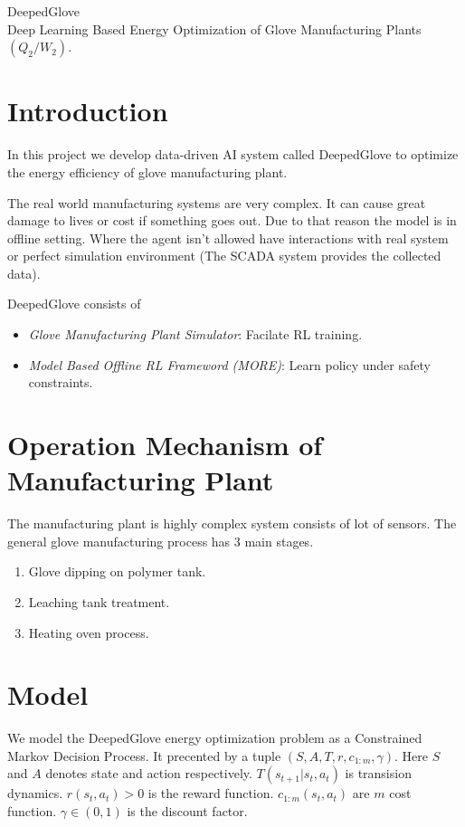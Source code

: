 \documentclass{article}
\begin{document}
\begin{center}
    \huge{DeepedGlove}\\[0.4em]
    \Large{Deep Learning Based Energy Optimization of Glove Manufacturing Plants \((Q_2/W_2)\).}\\[0.2em]
\end{center}


\section{Introduction}
In this project we develop data-driven AI system called DeepedGlove to optimize the energy efficiency of 
glove manufacturing plant. 

The real world manufacturing systems are very complex. It can cause great damage to lives or cost if something goes 
out. Due to that reason the model is in offline setting. Where the agent isn't allowed have interactions with real 
system or perfect simulation environment (The SCADA system provides the collected data).

DeepedGlove consists of 
\begin{itemize}
  \item \emph{Glove Manufacturing Plant Simulator}: Facilate RL training.
  \item \emph{Model Based Offline RL Frameword (MORE)}: Learn policy under safety constraints.
\end{itemize}

\section{Operation Mechanism of Manufacturing Plant}
The manufacturing plant is highly complex system consists of lot of sensors. The general glove manufacturing process 
has \(3\) main stages.
\begin{enumerate}
  \item Glove dipping on polymer tank.
  \item Leaching tank treatment.
  \item Heating oven process.
\end{enumerate}

\section{Model}
We model the DeepedGlove energy optimization problem as a Constrained Markov Decision Process. It precented by a 
tuple \(\left(S, A, T, r, c_{1:m}, \gamma\right)\). Here \(S\) and \(A\) denotes state and action respectively. 
\(T(s_{t+1}|s_t,a_t)\) is transision dynamics. \(r(s_t,a_t) > 0\) is the reward function. \(c_{1:m}(s_t, a_t)\)
are \(m\) cost function. \(\gamma \in (0,1)\) is the discount factor.
\end{document}
